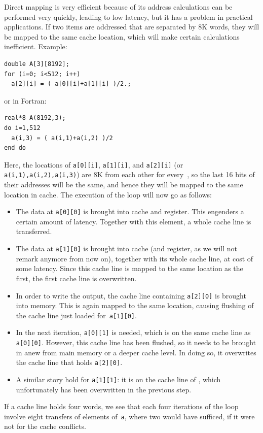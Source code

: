Direct mapping is very efficient because of its address calculations
can be performed very quickly, leading to low latency, but it
has a problem in practical applications. If two items are addressed
that are separated by 8K words, they will be mapped to the same cache
location, which will make certain calculations inefficient. Example:
\begin{verbatim}
double A[3][8192];
for (i=0; i<512; i++)
  a[2][i] = ( a[0][i]+a[1][i] )/2.;
\end{verbatim}
or in Fortran:
\begin{verbatim}
real*8 A(8192,3);
do i=1,512
  a(i,3) = ( a(i,1)+a(i,2) )/2
end do
\end{verbatim}
Here, the locations of \texttt{a[0][i]}, \texttt{a[1][i]}, and
\texttt{a[2][i]} (or \texttt{a(i,1),a(i,2),a(i,3)})
are 8K from each other for every~, so the last
16 bits of their addresses will be the same, and hence they will
be mapped to the same location in cache. The execution of the loop will now
go as follows:
\begin{itemize}
\item The data at \texttt{a[0][0]} is brought into cache and
  register. This engenders a certain amount of latency. Together with
  this element, a whole cache line is transferred.
\item The data at \texttt{a[1][0]} is brought into cache (and
  register, as we will not remark anymore from now on), together
  with its whole cache line, at cost of some latency. Since this cache
  line is mapped to the same location as the first, the first cache
  line is overwritten.
\item In order to write the output, the cache line containing
  \texttt{a[2][0]} is brought into memory. This is again mapped to the
  same location, causing flushing of the cache line just loaded
  for~\texttt{a[1][0]}.
\item In the next iteration, \texttt{a[0][1]} is needed, which is
  on the same cache line as \texttt{a[0][0]}. However, this cache line
  has been flushed, so it needs to be brought in anew from main memory
  or a deeper cache level. In doing so, it overwrites the cache line
  that holds \texttt{a[2][0]}.
\item A similar story hold for \texttt{a[1][1]}: it is on the cache
  line of , which unfortunately has been overwritten in
  the previous step.
\end{itemize}
If a cache line holds four words, we see that each four iterations of
the loop involve eight transfers of elements of~\texttt{a}, where two
would have sufficed, if it were not for the cache conflicts.

